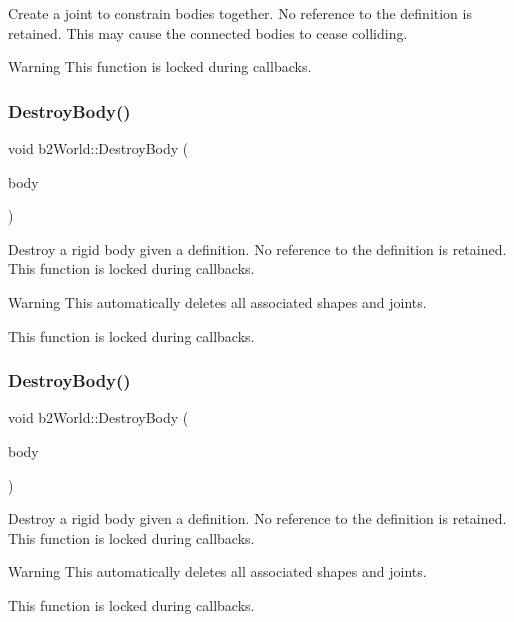 Create a joint to constrain bodies together. No reference to the definition is retained. This may cause the connected bodies to cease colliding. \begin{DoxyWarning}{Warning}
This function is locked during callbacks. 
\end{DoxyWarning}
\mbox{\label{classb2World_ad52231ad7a9556ef5735ac79cbcd8fcf}} 
\subsubsection{\texorpdfstring{Destroy\+Body()}{DestroyBody()}\hspace{0.1cm}{\footnotesize\ttfamily [1/2]}}
{\footnotesize\ttfamily void b2\+World\+::\+Destroy\+Body (\begin{DoxyParamCaption}\item[{\hyperlink{classb2Body}{b2\+Body} $\ast$}]{body }\end{DoxyParamCaption})}

Destroy a rigid body given a definition. No reference to the definition is retained. This function is locked during callbacks. \begin{DoxyWarning}{Warning}
This automatically deletes all associated shapes and joints. 

This function is locked during callbacks. 
\end{DoxyWarning}
\mbox{\label{classb2World_ad52231ad7a9556ef5735ac79cbcd8fcf}} 
\subsubsection{\texorpdfstring{Destroy\+Body()}{DestroyBody()}\hspace{0.1cm}{\footnotesize\ttfamily [2/2]}}
{\footnotesize\ttfamily void b2\+World\+::\+Destroy\+Body (\begin{DoxyParamCaption}\item[{\hyperlink{classb2Body}{b2\+Body} $\ast$}]{body }\end{DoxyParamCaption})}

Destroy a rigid body given a definition. No reference to the definition is retained. This function is locked during callbacks. \begin{DoxyWarning}{Warning}
This automatically deletes all associated shapes and joints. 

This function is locked during callbacks. 
\end{DoxyWarning}
\mbox{\label{classb2World_add5942aef171e54cfa384c8975746dca}} 
